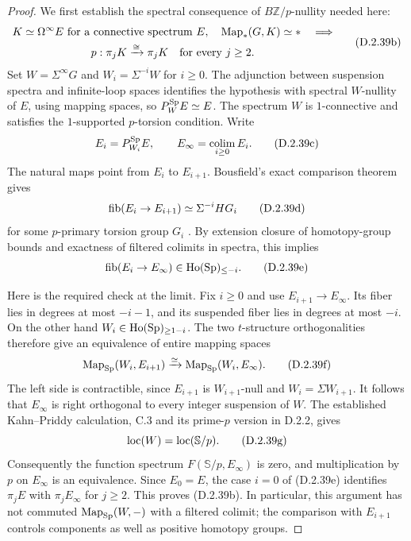 \begin{proof}
We first establish the spectral consequence of
$B\mathbb Z/p$-nullity needed here:
\[
 \begin{gathered}
 K\simeq\Omega^\infty E\text{ for a connective spectrum }E,
 \quad\operatorname{Map}_*(G,K)\simeq *\quad\Longrightarrow\\
 p:\pi_jK\xrightarrow{\cong}\pi_jK
                  \quad\text{for every }j\geq2.
 \end{gathered}
 \tag{D.2.39b}
\]
Set $W=\Sigma^\infty G$ and $W_i=\Sigma^{-i}W$ for $i\geq0$.
The adjunction between suspension spectra and infinite-loop
spaces identifies the hypothesis with spectral $W$-nullity of
$E$, using mapping spaces, so $P_W^{\mathrm{Sp}}E\simeq E$.
The spectrum $W$ is $1$-connective and satisfies the
$1$-supported $p$-torsion condition. Write
\[
       E_i=P_{W_i}^{\mathrm{Sp}}E,
       \qquad E_\infty=\operatorname*{colim}_{i\geq0}E_i.
 \tag{D.2.39c}
\]
The natural maps point from $E_i$ to $E_{i+1}$.
Bousfield's exact comparison theorem gives
\[
       \operatorname{fib}(E_i\to E_{i+1})\simeq\Sigma^{-i}HG_i
 \tag{D.2.39d}
\]
for some $p$-primary torsion group $G_i$
\cite[Theorem~2.6, p.~37]{Bousfield1996ULP}.
By extension closure of homotopy-group bounds and exactness of
filtered colimits in spectra, this implies
\[
       \operatorname{fib}(E_i\to E_\infty)\in\operatorname{Ho}(\mathrm{Sp})_{\leq-i}.
 \tag{D.2.39e}
\]

Here is the required check at the limit. Fix $i\geq0$ and use
$E_{i+1}\to E_\infty$. Its fiber lies in degrees at most
$-i-1$, and its suspended fiber lies in degrees at most $-i$.
On the other hand $W_i\in\operatorname{Ho}(\mathrm{Sp})_{\geq1-i}$.
The two $t$-structure orthogonalities therefore give an
equivalence of entire mapping spaces
\[
 \operatorname{Map}_{\mathrm{Sp}}(W_i,E_{i+1})
          \xrightarrow{\simeq}\operatorname{Map}_{\mathrm{Sp}}(W_i,E_\infty).
 \tag{D.2.39f}
\]
The left side is contractible, since $E_{i+1}$ is
$W_{i+1}$-null and $W_i=\Sigma W_{i+1}$.
It follows that $E_\infty$ is right orthogonal to every
integer suspension of $W$. The established Kahn--Priddy
calculation, C.3 and its prime-$p$ version in D.2.2, gives
\[
             \operatorname{loc}(W)=\operatorname{loc}(\mathbb S/p).
 \tag{D.2.39g}
\]
Consequently the function spectrum
$F(\mathbb S/p,E_\infty)$ is zero, and multiplication by $p$
on $E_\infty$ is an equivalence. Since $E_0=E$, the case
$i=0$ of \textup{(D.2.39e)} identifies $\pi_jE$ with
$\pi_jE_\infty$ for $j\geq2$. This proves
\textup{(D.2.39b)}. In particular, this argument has not
commuted $\operatorname{Map}_{\mathrm{Sp}}(W,-)$ with a filtered colimit; the
comparison with $E_{i+1}$ controls components as well as
positive homotopy groups.


\end{proof}
